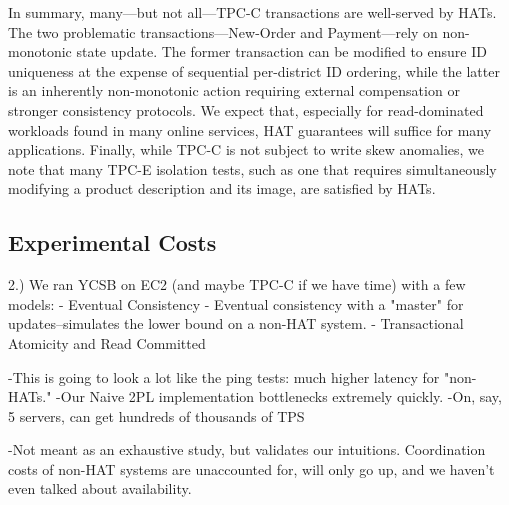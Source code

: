 In summary, many---but not all---TPC-C transactions are well-served by
HATs. The two problematic transactions---New-Order and Payment---rely
on non-monotonic state update. The former transaction can be modified
to ensure ID uniqueness at the expense of sequential per-district ID
ordering, while the latter is an inherently non-monotonic action
requiring external compensation or stronger consistency protocols. We
expect that, especially for read-dominated workloads found in many
online services, HAT guarantees will suffice for many
applications. Finally, while TPC-C is not subject to write skew
anomalies, we note that many TPC-E isolation tests, such as one that
requires simultaneously modifying a product description and its image,
are satisfied by HATs.

\subsection{Experimental Costs}


2.) We ran YCSB on EC2 (and maybe TPC-C if we have time) with a few models:
	- Eventual Consistency
	- Eventual consistency with a "master" for updates--simulates the lower bound on a non-HAT system.
	- Transactional Atomicity and Read Committed
	
	-This is going to look a lot like the ping tests: much higher latency for "non-HATs."
	-Our Naive 2PL implementation bottlenecks extremely quickly.
	-On, say, 5 servers, can get hundreds of thousands of TPS

	-Not meant as an exhaustive study, but validates our intuitions. Coordination costs of non-HAT systems are unaccounted for, will only go up, and we haven't even talked about availability.
